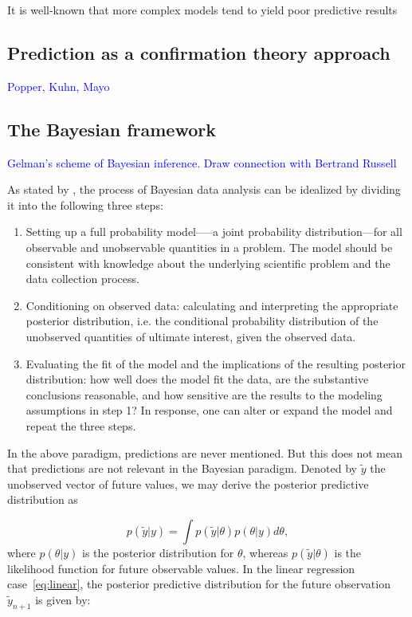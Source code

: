 \documentclass{statsoc}
\begin{document}
It is well-known that more complex models tend to yield poor predictive results



\subsection{Prediction as a confirmation theory approach}

\textcolor{blue}{Popper, Kuhn, Mayo}

\subsection{The Bayesian framework}

\textcolor{blue}{Gelman's scheme of Bayesian inference. Draw connection with Bertrand Russell}

As stated by \cite{gelman2013bayesian}, the process of Bayesian data analysis can be idealized by dividing it into the following three steps:

\begin{enumerate}
\item Setting up a full probability model—--a joint probability distribution---for all observable and unobservable quantities 
           in a problem. The model should be consistent with knowledge about the underlying scientific problem and the data collection 
           process.
\item Conditioning on observed data: calculating and interpreting the appropriate posterior distribution, i.e. the conditional probability 
           distribution of the unobserved quantities of ultimate interest, given the observed data.
\item Evaluating the fit of the model and the implications of the resulting posterior distribution: how well does the model fit the 
           data, are the substantive conclusions reasonable, and how sensitive are the results to the modeling assumptions in step 1? 
           In response, one can alter or expand the model and repeat the three steps.
\end{enumerate}
%
In the above paradigm, predictions are never mentioned. But this does not mean that predictions are not relevant in the Bayesian paradigm. Denoted by $\tilde{y}$ the unobserved vector of future values, we may derive the posterior predictive distribution as

\begin{equation}
p(\tilde{y}|y) = \int p(\tilde{y}|\theta)p(\theta|y) d\theta,
\label{eq:ppdist}
\end{equation}
%
where $p(\theta|y)$ is the posterior distribution for $\theta$, whereas $p(\tilde{y}|\theta)$ is the likelihood function for future observable values. In the linear regression case~\eqref{eq:linear}, the posterior predictive distribution for the future observation $\tilde{y}_{n+1}$ is given by:
\end{document}
